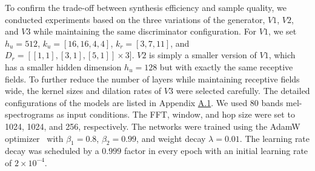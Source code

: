 To confirm the trade-off between synthesis efficiency and sample quality, we conducted experiments based on the three variations of the generator, $V1$, $V2$, and $V3$ while maintaining the same discriminator configuration. For $V1$, we set $h_u=512$, $k_u=[16, 16, 4, 4]$, $k_r=[3,7,11]$, and $D_r=[[1,1],[3,1],[5,1]] \times 3]$. $V2$ is simply a smaller version of $V1$, which has a smaller hidden dimension $h_u=128$ but with exactly the same receptive fields. To further reduce the number of layers while maintaining receptive fields wide, the kernel sizes and dilation rates of $V3$ were selected carefully. The detailed configurations of the models are listed in Appendix \hyperref[app-a1]{A.1}. We used 80 bands mel-spectrograms as input conditions. The FFT, window, and hop size were set to 1024, 1024, and 256, respectively. The networks were trained using the AdamW optimizer~\citep{loshchilov2017decoupled} with $\beta_1=0.8$, $\beta_2=0.99$, and weight decay $\lambda=0.01$. The learning rate decay was scheduled by a $0.999$ factor in every epoch with an initial learning rate of $2\times 10^{-4}$.
